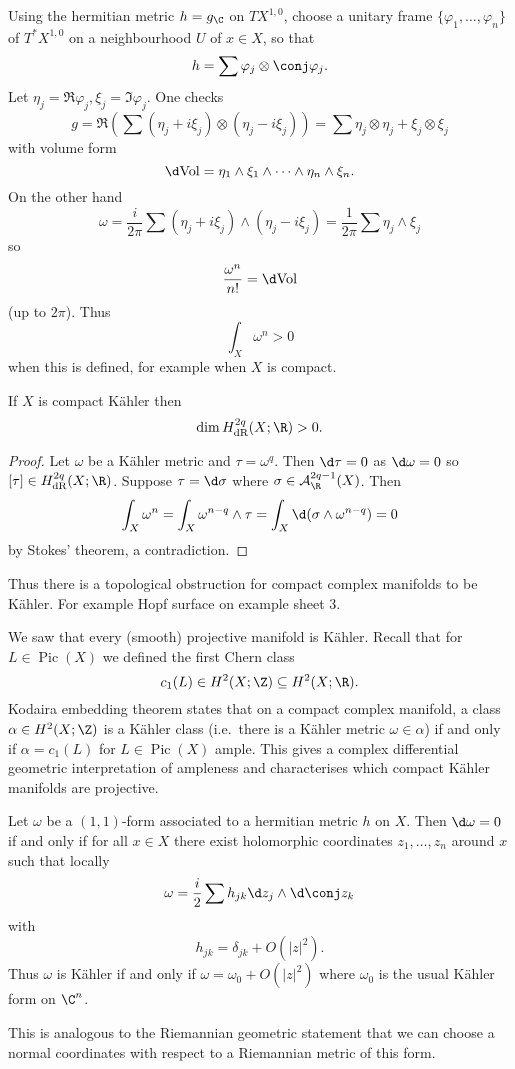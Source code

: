 \documentclass[a4paper]{article}
\newcommand{\w}{\wedge} %
\DeclareMathOperator{\Pic}{Pic} %
\begin{document}
Using the hermitian metric \(h = g_\C\) on \(TX^{1, 0}\), choose a unitary frame \(\{\varphi_1, \dots, \varphi_n\}\) of \(T^*X^{1, 0}\) on a neighbourhood \(U\) of \(x \in X\), so that
\[
  h = \sum \varphi_j \otimes \conj \varphi_j.
\]
Let \(\eta_j = \Re \varphi_j, \xi_j = \Im \varphi_j\). One checks
\[
  g
  = \Re (\sum (\eta_j + i \xi_j) \otimes (\eta_j - i \xi_j))
  = \sum \eta_j \otimes \eta_j + \xi_j \otimes \xi_j
\]
with volume form
\[
  \d \text{Vol} = \eta_1 \w \xi_1 \w \cdots \w \eta_n \w \xi_n.
\]
On the other hand
\[
  \omega
  = \frac{i}{2\pi} \sum (\eta_j + i \xi_j) \w (\eta_j - i \xi_j)
  = \frac{1}{2\pi} \sum \eta_j \w \xi_j
\]
so
\[
  \frac{\omega^n}{n!} = \d \text{Vol}
\]
(up to \(2\pi\)). Thus
\[
  \int_X \omega^n > 0
\]
when this is defined, for example when \(X\) is compact.

\begin{proposition}
  If \(X\) is compact Kähler then
  \[
    \dim H^{2q}_{\text{dR}} (X; \R) > 0.
  \]
\end{proposition}

\begin{proof}
  Let \(\omega\) be a Kähler metric and \(\tau = \omega^q\). Then \(\d \tau = 0\) as \(\d \omega = 0\) so \([\tau] \in H^{2q}_{\text{dR}} (X; \R)\). Suppose \(\tau = \d \sigma\) where \(\sigma \in \mathcal A^{2q - 1}_\R(X)\). Then
  \[
    \int_X \omega^n
    = \int_X \omega^{n - q} \w \tau
    = \int_X \d (\sigma \w \omega^{n - q})
    = 0
  \]
  by Stokes' theorem, a contradiction.
\end{proof}

Thus there is a topological obstruction for compact complex manifolds to be Kähler. For example Hopf surface on example sheet 3.

\begin{remark}
  We saw that every (smooth) projective manifold is Kähler. Recall that for \(L \in \Pic(X)\) we defined the first Chern class
  \[
    c_1(L) \in H^2(X; \Z) \subseteq H^2(X; \R).
  \]
  Kodaira embedding theorem states that on a compact complex manifold, a class \(\alpha \in H^2(X; \Z)\) is a Kähler class (i.e.\ there is a Kähler metric \(\omega \in \alpha\)) if and only if \(\alpha = c_1(L)\) for \(L \in \Pic(X)\) ample. This gives a complex differential geometric interpretation of ampleness and characterises which compact Kähler manifolds are projective.
\end{remark}

\begin{proposition}
  Let \(\omega\) be a \((1, 1)\)-form associated to a hermitian metric \(h\) on \(X\). Then \(\d \omega = 0\) if and only if for all \(x \in X\) there exist holomorphic coordinates \(z_1, \dots, z_n\) around \(x\) such that locally
  \[
    \omega = \frac{i}{2} \sum h_{jk} \d z_j \w \d \conj z_k
  \]
  with
  \[
    h_{jk} = \delta_{jk} + O(|z|^2).
  \]
  Thus \(\omega\) is Kähler if and only if \(\omega = \omega_0 + O(|z|^2)\) where \(\omega_0\) is the usual Kähler form on \(\C^n\).
\end{proposition}
This is analogous to the Riemannian geometric statement that we can choose a normal coordinates with respect to a Riemannian metric of this form.
\end{document}
